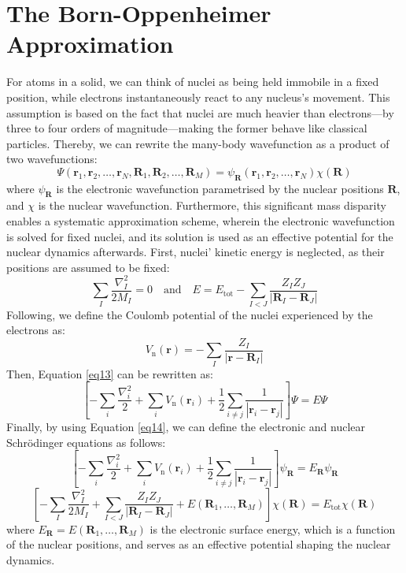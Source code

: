 \section{The Born-Oppenheimer Approximation}
For atoms in a solid, we can think of nuclei as being held immobile in a fixed position, while electrons instantaneously react to any nucleus's movement. This assumption is based on the fact that nuclei are much heavier than electrons---by three to four orders of magnitude---making the former behave like classical particles. Thereby, we can rewrite the many-body wavefunction as a product of two wavefunctions:
\begin{equation}
  \Psi(\mathbf{r}_1, \mathbf{r}_2, \ldots, \mathbf{r}_N, \mathbf{R}_1, \mathbf{R}_2, \ldots, \mathbf{R}_M) = \psi_{\mathbf{R}}(\mathbf{r}_1, \mathbf{r}_2, \ldots, \mathbf{r}_N)\chi(\mathbf{R})
  \label{eq14}
\end{equation}
where $\psi_{\mathbf{R}}$ is the electronic wavefunction parametrised by the nuclear positions $\mathbf{R}$, and $\chi$ is the nuclear wavefunction. Furthermore, this significant mass disparity enables a systematic approximation scheme, wherein the electronic wavefunction is solved for fixed nuclei, and its solution is used as an effective potential for the nuclear dynamics afterwards. First, nuclei' kinetic energy is neglected, as their positions are assumed to be fixed: 
\begin{equation}
  \label{eq15}
  \sum_I \frac{\nabla_I^2}{2 M_I} = 0
  \quad \text{and} \quad  E = E_{\text{tot}} - \sum_{I<J} \frac{Z_I Z_J}{|\mathbf{R}_I - \mathbf{R}_J|}
\end{equation}
Following, we define the Coulomb potential of the nuclei experienced by the electrons as:
\begin{equation}
  \label{eq16}
  V_{\text{n}}(\mathbf{r}) = - \sum_{I} \frac{Z_I}{|\mathbf{r} - \mathbf{R}_I|}
\end{equation}
Then, Equation \ref{eq13} can be rewritten as:
\begin{equation}
  \label{eq17}
  \left[
    -\sum_i \frac{\nabla_i^2}{2} + \sum_i V_{\text{n}}(\mathbf{r}_i) + \frac{1}{2} \sum_{i\neq j} \frac{1}{|\mathbf{r}_i - \mathbf{r}_j|} 
  \right] \Psi = E \Psi 
\end{equation}
Finally, by using Equation \ref{eq14}, we can define the electronic and nuclear Schrödinger equations as follows:
\begin{equation}
  \label{eq18}
  \left[
    -\sum_i \frac{\nabla_i^2}{2} + \sum_i V_{\text{n}}(\mathbf{r}_i) + \frac{1}{2} \sum_{i\neq j} \frac{1}{|\mathbf{r}_i - \mathbf{r}_j|} 
  \right] \psi_{\mathbf{R}} = E_{\mathbf{R}} \psi_{\mathbf{R}}
\end{equation}
\begin{equation}
  \label{eq19}
  \left[
    -\sum_I \frac{\nabla_I^2}{2 M_I} + \sum_{I<J} \frac{Z_I Z_J}{|\mathbf{R}_I - \mathbf{R}_J|} + E(\mathbf{R}_1,\dots,\mathbf{R}_M)\right] \chi(\mathbf{R}) = E_{\text{tot}} \chi(\mathbf{R})
\end{equation}
where $E_{\mathbf{R}}= E(\mathbf{R}_1,\dots,\mathbf{R}_M)$ is the electronic surface energy, which is a function of the nuclear positions, and serves as an effective potential shaping the nuclear dynamics. 

